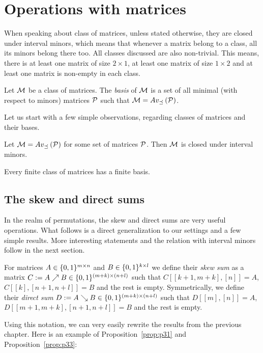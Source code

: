 \chapter{Operations with matrices}


When speaking about class of matrices, unless stated otherwise, they are closed under interval minors, which means that whenever a matrix belong to a class, all its minors belong there too. All classes discussed are also non-trivial. This means, there is at least one matrix of size $2\times1$, at least one matrix of size $1\times2$ and at least one matrix is non-empty in each class.

\begin{defn}
Let $\mathcal{M}$ be a class of matrices. The \emph{basis} of $\mathcal{M}$ is a set of all minimal (with respect to minors) matrices $\mathcal{P}$ such that $\mathcal{M}=Av_{\preceq}\left(\mathcal{P}\right)$.
\end{defn}

Let us start with a few simple observations, regarding classes of matrices and their bases. 

\begin{obs}
Let $\mathcal{M}=Av_{\preceq}\left(\mathcal{P}\right)$ for some set of matrices $\mathcal{P}$. Then $\mathcal{M}$ is closed under interval minors.
\end{obs}

\begin{obs}
Every finite class of matrices has a finite basis.
\end{obs}

\section{The skew and direct sums}
In the realm of permutations, the skew and direct sums are very useful operations. What follows is a direct generalization to our settings and a few simple results. More interesting statements and the relation with interval minors follow in the next section.

\begin{defn}
For matrices $A\in\{0,1\}^{m\times n}$ and $B\in\{0,1\}^{k\times l}$ we define their \emph{skew sum} as a matrix $C:=A\nearrow B\in\{0,1\}^{(m+k)\times(n+l)}$ such that $C[[k+1,m+k],[n]]=A$, $C[[k],[n+1,n+l]]=B$ and the rest is empty. Symmetrically, we define their \emph{direct sum} $D:=A\searrow B\in\{0,1\}^{(m+k)\times(n+l)}$ such that $D[[m],[n]]=A$, $D[[m+1,m+k],[n+1,n+l]]=B$ and the rest is empty.
\end{defn}

Using this notation, we can very easily rewrite the results from the previous chapter. Here is an example of Proposition~\ref{prop:p31} and Proposition~\ref{prop:p33}:

